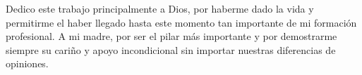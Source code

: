 
Dedico este trabajo principalmente a Dios, por haberme dado la vida y permitirme el haber llegado hasta este momento tan importante de mi formación profesional. A mi madre, por ser el pilar más importante y por demostrarme siempre su cariño y apoyo incondicional sin importar nuestras diferencias de opiniones. 
